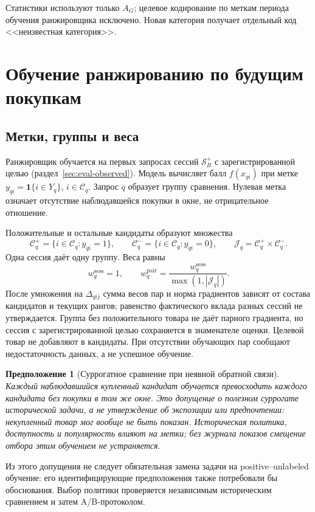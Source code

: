 \documentclass[12pt,a4paper]{article}
\newcommand{\ind}{\mathbf 1}
\theoremstyle{plainru}
\newtheorem{assumption}{Предположение}[section]
\begin{document}
Статистики используют только $A_G$; целевое кодирование по меткам
периода обучения ранжировщика исключено. Новая категория получает
отдельный код <<неизвестная категория>>.

\section{Обучение ранжированию по будущим покупкам}\label{sec:model-ranking}

\subsection{Метки, группы и веса}

Ранжировщик обучается на первых запросах сессий $\mathcal S_B^+$
с зарегистрированной целью (раздел~\ref{sec:eval-observed}).
Модель вычисляет балл $f(x_{qi})$ при метке
$y_{qi}=\ind\{i\in Y_q\}$, $i\in\mathcal C_q$.
Запрос $q$ образует группу сравнения. Нулевая метка означает
отсутствие наблюдавшейся покупки в окне, не отрицательное отношение.

Положительные и остальные кандидаты образуют множества
\begin{equation}\label{eq:model-pair-sets}
\mathcal C_q^+=\{i\in\mathcal C_q:y_{qi}=1\},\qquad
\mathcal C_q^-=\{i\in\mathcal C_q:y_{qi}=0\},\qquad
\mathcal J_q=\mathcal C_q^+\times\mathcal C_q^-.
\end{equation}
Одна сессия даёт одну группу. Веса равны
\begin{equation}\label{eq:model-ranking-weights}
w_q^{\mathrm{sess}}=1,\qquad
w_q^{\mathrm{pair}}=\frac{w_q^{\mathrm{sess}}}{\max(1,|\mathcal J_q|)}.
\end{equation}
После умножения на $\Delta_{qij}$ сумма весов пар
и норма градиентов зависят от состава кандидатов и текущих рангов;
равенство фактического вклада разных сессий не утверждается.
Группа без положительного товара не даёт парного градиента,
но сессия с зарегистрированной целью сохраняется в знаменателе оценки.
Целевой товар не добавляют в кандидаты. При отсутствии обучающих пар
сообщают недостаточность данных, а не успешное обучение.

\begin{assumption}[Суррогатное сравнение при неявной обратной связи]
\label{ass:model-implicit-negatives}
Каждый наблюдавшийся купленный кандидат обучается превосходить
каждого кандидата без покупки в том же окне. Это допущение о полезном
суррогате исторической задачи, а не утверждение об экспозиции
или предпочтении: некупленный товар мог вообще не быть показан.
Историческая политика, доступность и популярность влияют на метки;
без журнала показов смещение отбора этим обучением не устраняется.
\end{assumption}
Из этого допущения не следует обязательная замена задачи
на positive--unlabeled обучение: его идентифицирующие предположения
также потребовали бы обоснования. Выбор политики проверяется
независимым историческим сравнением и затем A/B-протоколом.
\end{document}
